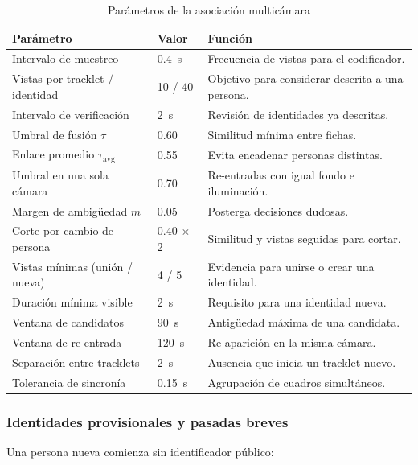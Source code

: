 \documentclass[12pt,letterpaper]{article}
\begin{document}
\begin{table}[H]
\caption{Parámetros de la asociación multicámara}
\label{tab:assoc_params}
\centering
\footnotesize
\begin{tabular}{p{}p{}p{}}
\hline
\textbf{Parámetro} & \textbf{Valor} & \textbf{Función} \\
\hline
Intervalo de muestreo & 0.4~s & Frecuencia de vistas para el codificador. \\
Vistas por tracklet / identidad & 10 / 40 & Objetivo para considerar descrita a una persona. \\
Intervalo de verificación & 2~s & Revisión de identidades ya descritas. \\
Umbral de fusión $\tau$ & 0.60 & Similitud mínima entre fichas. \\
Enlace promedio $\tau_{\text{avg}}$ & 0.55 & Evita encadenar personas distintas. \\
Umbral en una sola cámara & 0.70 & Re-entradas con igual fondo e iluminación. \\
Margen de ambigüedad $m$ & 0.05 & Posterga decisiones dudosas. \\
Corte por cambio de persona & 0.40 $\times$ 2 & Similitud y vistas seguidas para cortar. \\
Vistas mínimas (unión / nueva) & 4 / 5 & Evidencia para unirse o crear una identidad. \\
Duración mínima visible & 2~s & Requisito para una identidad nueva. \\
Ventana de candidatos & 90~s & Antigüedad máxima de una candidata. \\
Ventana de re-entrada & 120~s & Re-aparición en la misma cámara. \\
Separación entre tracklets & 2~s & Ausencia que inicia un tracklet nuevo. \\
Tolerancia de sincronía & 0.15~s & Agrupación de cuadros simultáneos. \\
\hline
\end{tabular}
\end{table}

\subsubsection{Identidades provisionales y pasadas breves}

Una persona nueva comienza sin identificador público:
\end{document}
